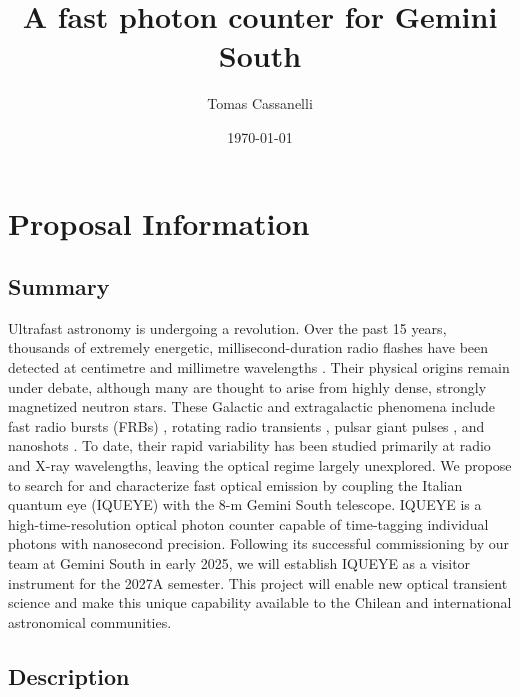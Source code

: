 \documentclass[
    11pt,
    a4paper,
    ]{article}
\begin{document}
\title{A fast photon counter for Gemini South}
\author{Tomas Cassanelli}
\date{\today} 

\maketitle
\setcounter{section}{1}

\section{Proposal Information}

\subsection{Summary}

Ultrafast astronomy is undergoing a revolution. Over the past 15 years, thousands of extremely energetic, millisecond-duration radio flashes have been detected at centimetre and millimetre wavelengths \cite{2022A&ARv..30....2P,2026ApJS..283...34C,2024NatAs...8.1429C}. Their physical origins remain under debate, although many are thought to arise from highly dense, strongly magnetized neutron stars. These Galactic and extragalactic phenomena include fast radio bursts (FRBs) \cite{2026arXiv260627546C}, rotating radio transients \cite{2026MNRAS.549ag787A}, pulsar giant pulses \cite{2024ApJ...973...87D}, and nanoshots \cite{2003Natur.422..141H}. To date, their rapid variability has been studied primarily at radio and X-ray wavelengths, leaving the optical regime largely unexplored. We propose to search for and characterize fast optical emission by coupling the Italian quantum eye (IQUEYE) with the 8-m Gemini South telescope. IQUEYE is a high-time-resolution optical photon counter capable of time-tagging individual photons with nanosecond precision. Following its successful commissioning by our team at Gemini South in early 2025, we will establish IQUEYE as a visitor instrument for the 2027A semester. This project will enable new optical transient science and make this unique capability available to the Chilean and international astronomical communities.
  
\subsection{Description}
\end{document}
